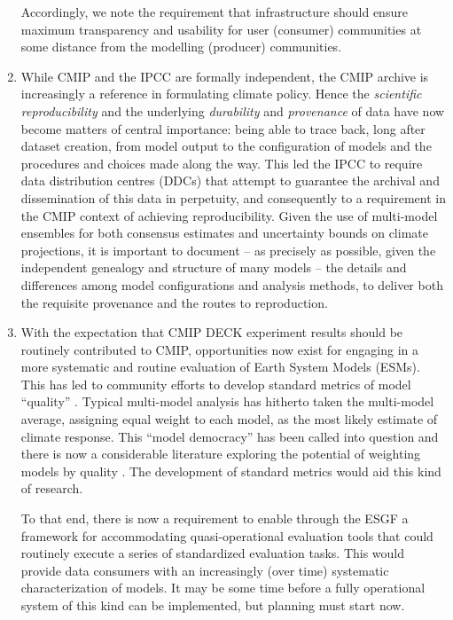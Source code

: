 \documentclass[gmd,manuscript]{copernicus}
\begin{document}
\begin{enumerate}
  Accordingly, we note the requirement that infrastructure should
  ensure maximum transparency and usability for user (consumer)
  communities at some distance from the modelling (producer)
  communities.
\item\label{repro} While CMIP and the IPCC are formally independent,
  the CMIP archive is increasingly a reference in formulating climate
  policy. Hence the \emph{scientific reproducibility}
  \citep{ref:collinstabak2014} and the underlying \emph{durability}
  and \emph{provenance} of data have now become matters of central
  importance: being able to trace
  back, long after dataset creation, from model output to the configuration of
  models and the procedures and choices made along the way. This led the
  IPCC to require data distribution centres (DDCs) that attempt to
  guarantee the archival and dissemination of this data in perpetuity,
  and consequently to a requirement in the CMIP context of
  achieving reproducibility. Given the use of multi-model ensembles
  for both consensus estimates and uncertainty bounds on climate
  projections, it is important to document -- as precisely as
  possible, given the independent genealogy and structure of many
  models -- the details and differences among model configurations and
  analysis methods, to deliver both the requisite provenance and the
  routes to reproduction.
\item\label{analysis} With the expectation that CMIP DECK experiment
  results should be routinely contributed to CMIP, opportunities now
  exist for engaging in a more systematic and routine evaluation of
  Earth System Models (ESMs). This has led to community efforts to
  develop standard metrics of model ``quality''
  \citep{ref:eyringetal2016,ref:gleckleretal2016}.
  Typical multi-model analysis has hitherto taken the multi-model
  average, assigning equal weight to each model, as the most likely
  estimate of climate response. This ``model democracy''
  \citep{ref:knutti2010} has been called into question and there is
  now a considerable literature exploring the potential of weighting
  models by quality \citep{ref:knuttietal2017}. The development of
  standard metrics would aid this kind of research.

  To that end, there is now a requirement to enable through the ESGF a
  framework for accommodating quasi-operational evaluation tools that
  could routinely execute a series of standardized evaluation tasks.
  This would provide data consumers with an increasingly (over time)
  systematic characterization of models. It may be some time before a
  fully operational system of this kind can be implemented, but
  planning must start now.


\end{enumerate}
\end{document}
